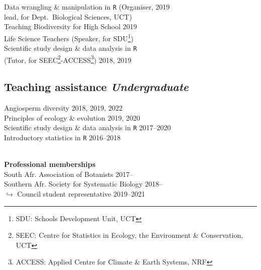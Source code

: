 \documentclass[10pt]{article}
\begin{document}
\begin{multicols}{2}
Data wrangling \& manipulation in \texttt{R}
  {\small (Organiser,}                             \hfill {\small       2019} \\
  \hspace{2em} {\small lead, for Dept.~Biological
    Sciences, UCT)}                                                           \\
Teaching Biodiversity for High School              \hfill {\small       2019} \\
  \hspace{2em} Life Science Teachers {\small
    (Speaker, for SDU\footnote{SDU: Schools Development
    Unit, UCT})}                                                              \\
Scientific study design \& data analysis in \texttt{R}                        \\
  \hspace{2em} {\small(Tutor, for SEEC\footnote{
    SEEC: Centre for Statistics in Ecology, the
    Environment \& Conservation, UCT}-ACCESS\footnote{
      ACCESS: Applied Centre for Climate \& Earth Systems,
      NRF})}                                       \hfill {\small 2018, 2019} \\

\subsection*{Teaching assistance %
                                \hfill {\small \textmd{\textit{Undergraduate}}}}

Angiosperm diversity                         \hfill {\small 2018, 2019, 2022} \\
Principles of ecology \& evolution           \hfill {\small       2019, 2020} \\
Scientific study design \& data analysis in \texttt{R}
                                             \hfill {\small       2017--2020} \\
Introductory statistics in \texttt{R}        \hfill {\small       2016--2018} \\

\

\textbf{Professional memberships} \\ %
South Afr. Association of Botanists                                     \hfill {\small 2017--\hspace*{2.25em}} \\
Southern Afr. Society for Systematic Biology                            \hfill {\small 2018--\hspace*{2.25em}} \\
  \hspace{1em} {\small $\hookrightarrow$ Council student representative \hfill 2019--2021}


\end{multicols}
\end{document}
